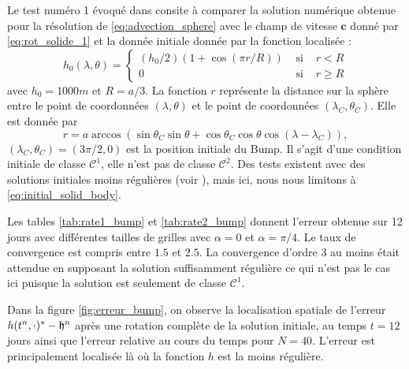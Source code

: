 Le test numéro 1 évoqué dans \cite{Williamson1992} consite à comparer la solution numérique obtenue pour la résolution de \eqref{eq:advection_sphere} avec le champ de vitesse $\mathbf{c}$ donné par \eqref{eq:rot_solide_1} et la donnée initiale donnée par la fonction localisée :
\begin{equation}
h_0(\lambda, \theta) = \left\lbrace
\begin{array}{ccl}
(h_0/2) (1 + \cos (\pi r/R) ) & \text{ si } & r<R \\
0 & \text{ si } & r \geq R
\end{array}
\right.
\label{eq:initial_solid_body}
\end{equation}
avec $h_0 = 1000 \si{m}$ et $R=a/3$. La fonction $r$ représente la distance sur la sphère entre le point de coordonnées $(\lambda, \theta)$ et le point de coordonnées $(\lambda_C, \theta_C)$. Elle est donnée par
\begin{equation}
r = a \arccos \left( \sin \theta_C \sin \theta + \cos \theta_C \cos \theta \cos (\lambda - \lambda_C) \right),
\end{equation}
$(\lambda_C, \theta_C) = (3 \pi / 2 , 0)$ est la position initiale du Bump. Il s'agit d'une condition initiale de classe $\mathcal{C}^1$, elle n'est pas de classe $\mathcal{C}^2$. Des tests existent avec des solutions initiales moins régulières (voir \cite{Nair2010}), mais ici, nous nous limitons à \eqref{eq:initial_solid_body}.

Les tables \ref{tab:rate1_bump} et \ref{tab:rate2_bump} donnent l'erreur obtenue sur 12 jours avec différentes tailles de grilles avec $\alpha=0$ et $\alpha = \pi/4$. Le taux de convergence est compris entre $1.5$ et $2.5$. La convergence d'ordre $3$ au moins était attendue en supposant la solution suffisamment régulière ce qui n'est pas le cas ici puisque la solution est seulement de classe $\mathcal{C}^1$.

Dans la figure \ref{fig:erreur_bump}, on observe la localisation spatiale de l'erreur $h(t^n, \cdot)^* - \mathfrak{h}^n$ après une rotation complète de la solution initiale, au temps $t=12$ jours ainsi que l'erreur relative au cours du temps pour $N=40$. L'erreur est principalement localisée là où la fonction $h$ est la moins régulière.

